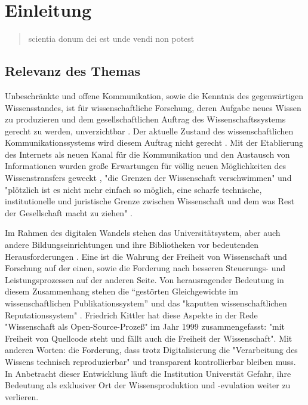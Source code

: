 \chapter{Einleitung} 

\begin{quote}
scientia donum dei est unde vendi non potest
\end{quote}

\section{Relevanz des Themas} 

Unbeschränkte und offene Kommunikation, sowie die Kenntnis des gegenwärtigen Wissensstandes, ist für wissenschaftliche Forschung, deren Aufgabe neues Wissen zu produzieren und dem gesellschaftlichen Auftrag des Wissenschaftssystems gerecht zu werden, unverzichtbar \cite{Hanekop_2014} \cite{glaeser2006} \cite{gibbons_1994} \cite{Luhmann1998}. Der aktuelle Zustand des wissenschaftlichen Kommunikationssystems wird diesem Auftrag nicht gerecht \cite{Schekman_2013}. Mit der Etablierung des Internets als neuen Kanal für die Kommunikation und den Austausch von Informationen wurden große Erwartungen für völlig neuen Möglichkeiten des Wissenstransfers geweckt \cite{Hanekop_2014} \cite{schulze_2013_open} \cite{albert_2006_open_implications} \cite{Goodrum_2001} \cite{Lawrence_1999}, "die Grenzen der Wissenschaft verschwimmen" \cite{Scheliga_2014} und "plötzlich ist es nicht mehr einfach so möglich, eine scharfe technische, institutionelle und juristische Grenze zwischen Wissenschaft und dem was Rest der Gesellschaft macht zu ziehen" \cite{kelty_2004}.

Im Rahmen des digitalen Wandels stehen das Universitätsystem, aber auch andere Bildungseinrichtungen und ihre Bibliotheken vor bedeutenden Herausforderungen \cite{Harter2006} \cite{Gu_don_2004} \cite{osterloh2008anreize}. Eine ist die Wahrung der Freiheit von Wissenschaft und Forschung auf der einen, sowie die Forderung nach besseren Steuerungs- und Leistungsprozessen \cite{Adler_2009} \cite{gibbons_1994} auf der anderen Seite. Von herausragender Bedeutung in diesem Zusammenhang stehen die “gestörten Gleichgewichte im wissenschaftlichen Publikationssystem” \cite{cite:0} und das "kaputten wissenschaftlichen Reputationssystem" \cite{suchen}. Friedrich Kittler hat diese Aspekte in der Rede "Wissenschaft als Open-Source-Prozeß" im Jahr 1999 zusammengefasst: "mit Freiheit von Quellcode steht und fällt auch die Freiheit der Wissenschaft". Mit anderen Worten: die Forderung, dass trotz Digitalisierung die "Verarbeitung des Wissens technisch reproduzierbar" \cite{cite:1} und transparent kontrollierbar \cite{suchen} bleiben muss. In Anbetracht dieser Entwicklung läuft die Institution Universtät Gefahr, ihre Bedeutung als exklusiver Ort der Wissensproduktion \cite{suchen} und -evulation \cite{suchen} weiter zu verlieren.

